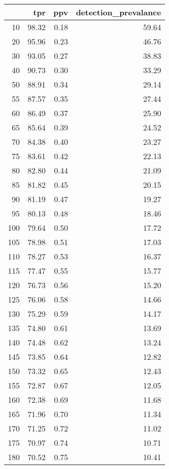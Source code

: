\begin{table}[ht]
\centering
\begin{tabular}{rrrr}
  \hline
 & tpr & ppv & detection\_prevalance \\ 
  \hline
  10 & 98.32 & 0.18 & 59.64 \\ 
    20 & 95.96 & 0.23 & 46.76 \\ 
    30 & 93.05 & 0.27 & 38.83 \\ 
    40 & 90.73 & 0.30 & 33.29 \\ 
    50 & 88.91 & 0.34 & 29.14 \\ 
    55 & 87.57 & 0.35 & 27.44 \\ 
    60 & 86.49 & 0.37 & 25.90 \\ 
    65 & 85.64 & 0.39 & 24.52 \\ 
    70 & 84.38 & 0.40 & 23.27 \\ 
    75 & 83.61 & 0.42 & 22.13 \\ 
    80 & 82.80 & 0.44 & 21.09 \\ 
    85 & 81.82 & 0.45 & 20.15 \\ 
    90 & 81.19 & 0.47 & 19.27 \\ 
    95 & 80.13 & 0.48 & 18.46 \\ 
   100 & 79.64 & 0.50 & 17.72 \\ 
   105 & 78.98 & 0.51 & 17.03 \\ 
   110 & 78.27 & 0.53 & 16.37 \\ 
   115 & 77.47 & 0.55 & 15.77 \\ 
   120 & 76.73 & 0.56 & 15.20 \\ 
   125 & 76.06 & 0.58 & 14.66 \\ 
   130 & 75.29 & 0.59 & 14.17 \\ 
   135 & 74.80 & 0.61 & 13.69 \\ 
   140 & 74.48 & 0.62 & 13.24 \\ 
   145 & 73.85 & 0.64 & 12.82 \\ 
   150 & 73.32 & 0.65 & 12.43 \\ 
   155 & 72.87 & 0.67 & 12.05 \\ 
   160 & 72.38 & 0.69 & 11.68 \\ 
   165 & 71.96 & 0.70 & 11.34 \\ 
   170 & 71.25 & 0.72 & 11.02 \\ 
   175 & 70.97 & 0.74 & 10.71 \\ 
   180 & 70.52 & 0.75 & 10.41 \\ 

\end{tabular}
\end{table}
